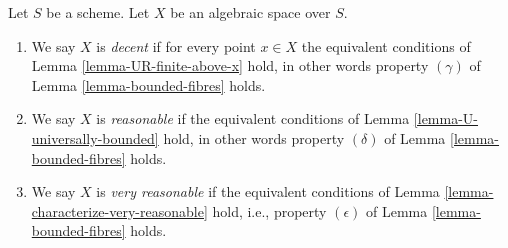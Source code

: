 \begin{definition}
\label{definition-very-reasonable}
Let $S$ be a scheme.
Let $X$ be an algebraic space over $S$.
\begin{enumerate}
\item We say $X$ is {\it decent} if for every point $x \in X$ the equivalent
conditions of
Lemma \ref{lemma-UR-finite-above-x}
hold, in other words property $(\gamma)$ of
Lemma \ref{lemma-bounded-fibres}
holds.
\item We say $X$ is {\it reasonable} if the equivalent conditions of
Lemma \ref{lemma-U-universally-bounded}
hold, in other words property $(\delta)$ of
Lemma \ref{lemma-bounded-fibres}
holds.
\item We say $X$ is {\it very reasonable} if the equivalent conditions of
Lemma \ref{lemma-characterize-very-reasonable}
hold, i.e., property $(\epsilon)$ of
Lemma \ref{lemma-bounded-fibres}
holds.
\end{enumerate}
\end{definition}